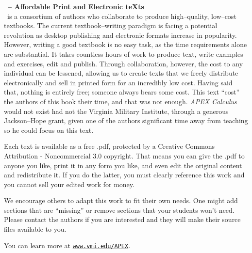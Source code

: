 
\noindent\textbf{\large \apex\  -- Affordable Print and Electronic teXts}\\

\apex\ is a consortium of authors  who collaborate to produce high--quality, low--cost textbooks. The current textbook--writing paradigm is facing a potential revolution as desktop publishing and electronic formats increase in popularity. However, writing a good textbook is no easy task, as the time requirements alone are substantial. It takes countless hours of work to produce text, write examples and exercises, edit and publish. Through collaboration, however, the cost to any individual can be lessened, allowing us to create texts that we freely distribute electronically and sell in printed form for an incredibly low cost. Having said that, nothing is entirely free; someone always bears some cost. This text ``cost'' the authors of this book their time, and that was not enough. \textit{APEX Calculus} would not exist had not the Virginia Military Institute, through a generous Jackson--Hope grant, given one of the authors significant time away from teaching so he could focus on this text.

Each text is available as a free .pdf, protected by a Creative Commons Attribution - Noncommercial 3.0 copyright. That  means you can give the .pdf to anyone you like, print it in any form you like, and even edit the original content and redistribute it. If you do the latter, you must  clearly reference this work and you cannot sell your edited work for money.

We encourage others to adapt this work to fit their own needs. One might add sections that are ``missing'' or remove sections that your students won't need. Please contact the authors if you are interested and they will make their source files available to you.

You can learn more at \texttt{\href{http://www.vmi.edu/APEX}{www.vmi.edu/APEX}}.
\thispagestyle{empty}

